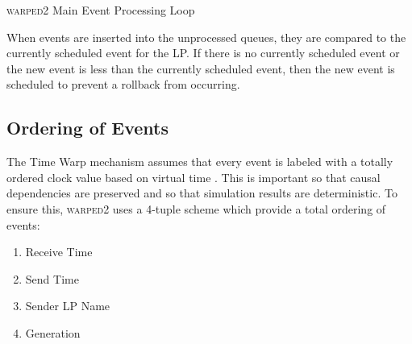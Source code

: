 \documentclass[11pt]{book}
\begin{document}
\begin{algorithm}
\DontPrintSemicolon
{}


\caption{\textsc{warped2} Main Event Processing Loop}\label{warped2_processing}
\end{algorithm}

When events are inserted into the unprocessed queues, they are compared to the currently scheduled
event for the LP.  If there is no currently scheduled event or the new event is less than the
currently scheduled event, then the new event is scheduled to prevent a rollback from occurring.

\subsection{Ordering of Events}

The Time Warp mechanism assumes that every event is labeled with a totally ordered clock value based
on virtual time \cite{jefferson-85}.  This is important so that causal dependencies are preserved
and so that simulation results are deterministic\cite{ronngren-99}.  To ensure this,
\textsc{warped2} uses a 4-tuple scheme which provide a total ordering of events:

\begin{enumerate}
    \item Receive Time
    \item Send Time
    \item Sender LP Name
    \item Generation
\end{enumerate}
\end{document}
